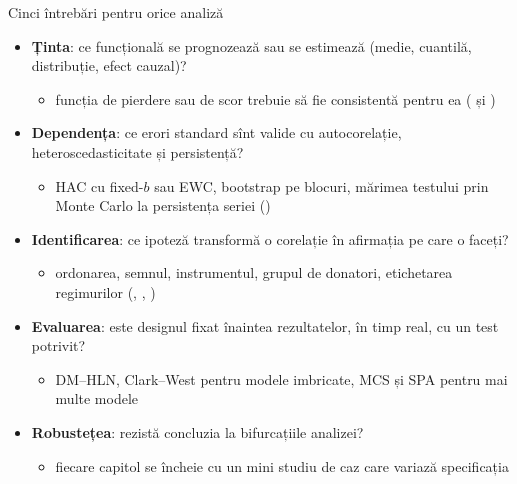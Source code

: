 \begin{frame}{Cinci întrebări pentru orice analiză}
\itemsize{\footnotesize}
\begin{itemize}
    \item \textbf{Ținta}: ce funcțională se prognozează sau se estimează (medie, cuantilă, distribuție, efect cauzal)?
    \begin{itemize}
        \item funcția de pierdere sau de scor trebuie să fie consistentă pentru ea ( și )
    \end{itemize}
    \item \textbf{Dependența}: ce erori standard sînt valide cu autocorelație, heteroscedasticitate și persistență?
    \begin{itemize}
        \item HAC cu fixed-$b$ sau EWC, bootstrap pe blocuri, mărimea testului prin Monte Carlo la persistența seriei ()
    \end{itemize}
    \item \textbf{Identificarea}: ce ipoteză transformă o corelație în afirmația pe care o faceți?
    \begin{itemize}
        \item ordonarea, semnul, instrumentul, grupul de donatori, etichetarea regimurilor (, , )
    \end{itemize}
    \item \textbf{Evaluarea}: este designul fixat înaintea rezultatelor, în timp real, cu un test potrivit?
    \begin{itemize}
        \item DM--HLN, Clark--West pentru modele imbricate, MCS și SPA pentru mai multe modele
    \end{itemize}
    \item \textbf{Robustețea}: rezistă concluzia la bifurcațiile analizei?
    \begin{itemize}
        \item fiecare capitol se încheie cu un mini studiu de caz care variază specificația
    \end{itemize}
\end{itemize}
\end{frame}

